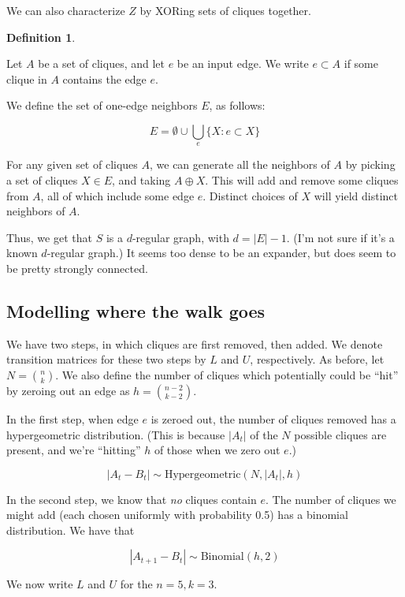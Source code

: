 \documentclass[12pt]{article}
\theoremstyle{definition}
\newtheorem{defn}{Definition}[section]
\begin{document}
We can also characterize $Z$ by XORing sets of cliques together.

\begin{defn} \label{def:oneEdgeNeighbors}

Let $A$ be a set of cliques, and let $e$ be an input edge. We write
$e \subset A$ if some clique in $A$ contains the edge $e$.

We define the set of one-edge neighbors $E$, as follows:

\[
E = \emptyset \cup \bigcup_e \{ X: e \subset X\}
\]

\end{defn}

For any given set of cliques $A$, we can generate all the neighbors
of $A$ by picking a set of cliques $X \in E$, and taking $A \oplus X$. This will
add and remove some cliques from $A$, all of which include some edge $e$.
Distinct choices of $X$ will yield distinct neighbors of $A$.

Thus, we get that $S$ is a $d$-regular graph, with $d = |E|-1$.
(I'm not sure if it's a known $d$-regular graph.) It seems too
dense to be an expander, but does seem to be pretty strongly connected.

\subsection{Modelling where the walk goes}

We have two steps, in which cliques are first removed, then added.
We denote transition matrices for these two steps by $L$ and $U$, respectively.
As before, let $N = {n \choose k}$.
We also define the number of cliques which potentially could be ``hit'' by
zeroing out an edge as $h = {{n-2} \choose {k-2}}$.

In the first step, when edge $e$ is zeroed out, the number of cliques removed has
a hypergeometric distribution. (This is because $|A_t|$ of the $N$ possible cliques
are present, and we're ``hitting'' $h$ of those when we zero out $e$.)

\[
|A_t - B_t| \sim \text{Hypergeometric}(N, |A_t|, h)
\]

In the second step, we know that {\em no} cliques contain $e$. The number of
cliques we might add (each chosen uniformly with probability 0.5) has 
a binomial distribution. We have that

\[
|A_{t+1} - B_t| \sim \text{Binomial}(h, 2)
\]

We now write $L$ and $U$ for the $n=5, k=3$.
\end{document}
